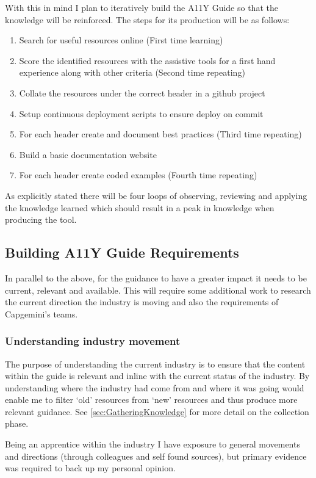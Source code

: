 With this in mind I plan to iteratively build the A11Y Guide so
that the knowledge will be reinforced. The steps for its production will be
as follows:
\begin{enumerate}
  \item Search for useful resources online (First time learning)
  \item Score the identified resources with the assistive tools for a first hand
  experience along with other criteria (Second time repeating)
  \item Collate the resources under the correct header in a github project
  \item Setup continuous deployment scripts to ensure deploy on commit
  \item For each header create and document best practices (Third time
  repeating)
  \item Build a basic documentation website
  \item For each header create coded examples (Fourth time repeating)
\end{enumerate}

As explicitly stated there will be four loops of observing, reviewing and
applying the knowledge learned which should result in a peak in knowledge
when producing the tool.

\subsection{Building A11Y Guide Requirements}
In parallel to the above, for the guidance to have a greater impact it
needs to be current, relevant and available. This will require some additional
work to research the current direction the industry is moving and also the
requirements of Capgemini's teams.

\subsubsection{Understanding industry movement}
\label{sec:uim}
The purpose of understanding the current industry is to ensure that the
content within the guide is relevant and inline with the current status of the
industry. By understanding where the industry had come from and where it was
going would enable me to filter `old' resources from `new' resources and thus
produce more relevant guidance. See \ref{sec:GatheringKnowledge} for more
detail on the collection phase.

Being an apprentice within the industry I have exposure to general movements
and directions (through colleagues and self found sources), but primary
evidence was required to back up my personal opinion.

